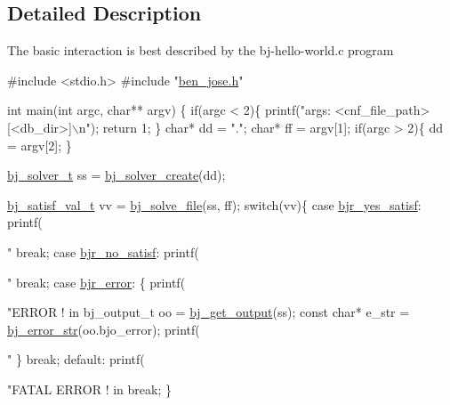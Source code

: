 \subsection{Detailed Description}
The basic interaction is best described by the bj-\/hello-\/world.\+c program


\begin{DoxyCodeInclude}

\textcolor{preprocessor}{#include <stdio.h>}
\textcolor{preprocessor}{#include "\hyperlink{ben__jose_8h}{ben\_jose.h}"}

\textcolor{keywordtype}{int} main(\textcolor{keywordtype}{int} argc, \textcolor{keywordtype}{char}** argv)
\{
    \textcolor{keywordflow}{if}(argc < 2)\{
        printf(\textcolor{stringliteral}{"args: <cnf\_file\_path> [<db\_dir>]\(\backslash\)n"});
        \textcolor{keywordflow}{return} 1;
    \}
    \textcolor{keywordtype}{char}* dd = \textcolor{stringliteral}{"."};
    \textcolor{keywordtype}{char}* ff = argv[1];
    \textcolor{keywordflow}{if}(argc > 2)\{
        dd = argv[2];
    \}
    
    \hyperlink{ben__jose_8h_a3825fe3519107001ca4d0679f1d0a110}{bj\_solver\_t} ss = \hyperlink{ben__jose_8cpp_a3f6cb5e5aac2da12b2d475c81909becf}{bj\_solver\_create}(dd);
    
    \hyperlink{group__docgrp___a_p_i_ga9aba221730ab694a549d25ee1aa28c69}{bj\_satisf\_val\_t}  vv = \hyperlink{ben__jose_8cpp_a65eb23939cc4ae39654dbd93343580c8}{bj\_solve\_file}(ss, ff);
    \textcolor{keywordflow}{switch}(vv)\{
        \textcolor{keywordflow}{case} \hyperlink{ben__jose_8h_ga9aba221730ab694a549d25ee1aa28c69af4c1851202dc8838008241c2a527a069}{bjr\_yes\_satisf}:
            printf(\textcolor{stringliteral}{"%
            \textcolor{keywordflow}{break};
        \textcolor{keywordflow}{case} \hyperlink{ben__jose_8h_ga9aba221730ab694a549d25ee1aa28c69adc2a37bfd4482eb5167ebb9d47245e8b}{bjr\_no\_satisf}:
            printf(\textcolor{stringliteral}{"%
            \textcolor{keywordflow}{break};
        \textcolor{keywordflow}{case} \hyperlink{ben__jose_8h_ga9aba221730ab694a549d25ee1aa28c69a5cee678e06286f3dd31c2f8d60e88979}{bjr\_error}:
            \{
                printf(\textcolor{stringliteral}{"ERROR ! in %
                bj\_output\_t oo = \hyperlink{ben__jose_8cpp_a2685b092d0a891b280bc1895d1deaef1}{bj\_get\_output}(ss);
                \textcolor{keyword}{const} \textcolor{keywordtype}{char}* e\_str = \hyperlink{ben__jose_8cpp_ab6303f60ba14cddd8b534b40830df31d}{bj\_error\_str}(oo.bjo\_error);
                printf(\textcolor{stringliteral}{"%
            \}
            \textcolor{keywordflow}{break};
        \textcolor{keywordflow}{default}:
            printf(\textcolor{stringliteral}{"FATAL ERROR ! in %
            \textcolor{keywordflow}{break};
    \}
    
}}}}}
\end{DoxyCodeInclude}
